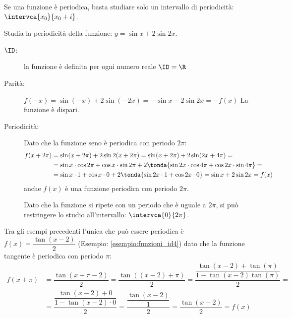 Se una funzione è periodica, basta studiare solo un intervallo di 
periodicità: \(\intervca{x_0}{x_0 +i}\).

\begin{esempio}
\label{esempio:funzioni_periodicita1}
Studia la periodicità della funzione: \(y = \sin x + 2 \sin 2x\).

\begin{description}
\item [\(\ID\):] \quad 
la funzione è definita per ogni numero reale \quad \(\ID = \R\)
\item [Parità:] \quad 
\(f(-x) = \sin (-x) + 2 \sin (-2x) = -\sin x - 2 \sin 2x = -f(x)\) \quad 
La funzione è dispari.
\item [Periodicità:] \quad 
Dato che la funzione seno è periodica con periodo \(2 \pi\):
\begin{align*}
f(x +2\pi) &= \sin (x +2\pi) + 2 \sin 2(x +2\pi) = 
  \sin (x +2\pi) + 2 \sin (2x +4\pi)= \\
&= \sin x \cdot \cos 2\pi + \cos x \cdot \sin 2\pi + 
   2 \tonda{\sin 2x \cdot \cos 4\pi + \cos 2x \cdot \sin 4\pi} = \\
&= \sin x \cdot 1 + \cos x \cdot 0 + 
   2 \tonda{\sin 2x \cdot 1 + \cos 2x \cdot 0} = 
  \sin x + 2 \sin 2x = f(x)
\end{align*}
anche \(f(x)\) è una funzione periodica con periodo \(2 \pi\). 
\begin{center}
\scalebox{.9}{\funperiodica}
\end{center}
Dato che la funzione si ripete con un 
periodo che è uguale a \(2\pi\), si può restringere lo studio 
all'intervallo: \(\intervca{0}{2\pi}\).
\end{description}
\end{esempio}

\begin{esempio}
Tra gli esempi precedenti l'unica che può essere periodica è 
\(f(x) = \dfrac{\tan(x -2)}{2}\) \quad 
(Esempio: \ref{esempio:funzioni_id4}) 
dato che la funzione tangente è periodica con periodo \(\pi\):
\begin{align*}
f(x +\pi) &= \dfrac{\tan(x+\pi -2)}{2} = 
   \dfrac{\tan((x -2) +\pi)}{2} = 
   \dfrac{\dfrac{\tan(x -2) +\tan{(\pi)}}{1 - \tan(x -2) \tan{(\pi)}}}{2} = \\
&= \dfrac{\dfrac{\tan(x -2) +0}{1 - \tan(x -2) \cdot 0}}{2} = 
   \dfrac{\dfrac{\tan(x -2)}{1}}{2} = 
   \dfrac{\tan(x -2)}{2} = f(x)
\end{align*}
\end{esempio}


